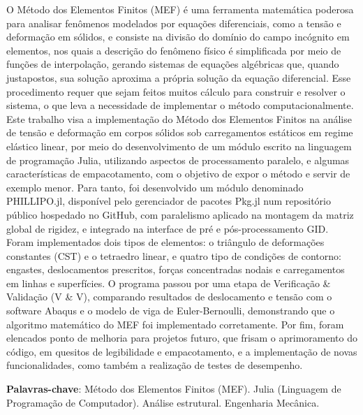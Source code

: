 
\setlength{\absparsep}{18pt} %
\begin{resumo}
O Método dos Elementos Finitos (MEF) é uma ferramenta matemática poderosa para analisar fenômenos modelados por equações diferenciais, como a tensão e deformação em sólidos, e consiste na divisão do domínio do campo incógnito em elementos, nos quais a descrição do fenômeno físico é simplificada por meio de funções de interpolação, gerando sistemas de equações algébricas que, quando justapostos, sua solução aproxima a própria solução da equação diferencial. Esse procedimento requer que sejam feitos muitos cálculo para construir e resolver o sistema, o que leva a necessidade de implementar o método computacionalmente. Este trabalho visa a implementação do Método dos Elementos Finitos na análise de tensão e deformação em corpos sólidos sob carregamentos estáticos em regime elástico linear, por meio do desenvolvimento de um módulo escrito na linguagem de programação Julia, utilizando aspectos de processamento paralelo, e algumas características de empacotamento, com o objetivo de expor o método e servir de exemplo menor. Para tanto, foi desenvolvido um módulo denominado PHILLIPO.jl, disponível pelo gerenciador de pacotes Pkg.jl num repositório público hospedado no GitHub, com paralelismo aplicado na montagem da matriz global de rigidez, e integrado na interface de pré e pós-processamento GID. Foram implementados dois tipos de elementos: o triângulo de deformações constantes (CST) e o tetraedro linear, e quatro tipo de condições de contorno: engastes, deslocamentos prescritos, forças concentradas nodais e carregamentos em linhas e superfícies. O programa passou por uma etapa de Verificação \& Validação (V \& V), comparando resultados de deslocamento e tensão com o software Abaqus e o modelo de viga de Euler-Bernoulli, demonstrando que o algoritmo matemático do MEF foi implementado corretamente. Por fim, foram elencados ponto de melhoria para projetos futuro, que frisam o aprimoramento do código, em quesitos de legibilidade e empacotamento, e a implementação de novas funcionalidades, como também a realização de testes de desempenho.



 \textbf{Palavras-chave}: Método dos Elementos Finitos (MEF). Julia (Linguagem de Programação de Computador). Análise estrutural. Engenharia Mecânica.

\end{resumo}
